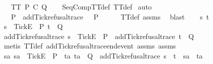 \begin{isabellebody}
{\ \ \ {\isachardoublequoteopen}TT{}\ {\isacharparenleft}P\ {\isacharsemicolon}\isactrlsub C\ Q{\isacharparenright}{\isachardoublequoteclose}\isanewline
%
\isadelimproof
\ \ %
\endisadelimproof
%
\isatagproof
{}\isamarkupfalse%
\ SeqCompTT{\isacharunderscore}def\ TT{}{\isacharunderscore}def\isanewline
{}\isamarkupfalse%
\ auto\isanewline
\ \ \isamarkupfalse%
\ {\isasymrho}\isanewline
\ \ \isamarkupfalse%
\ {\isachardoublequoteopen}{\isasymrho}\ {\isasymin}\ P\ {\isasymLongrightarrow}\ add{\isacharunderscore}Tick{\isacharunderscore}refusal{\isacharunderscore}trace\ {\isasymrho}\ {\isasymin}\ P{\isachardoublequoteclose}\isanewline
\ \ \ \ \isamarkupfalse%
\ TT{}{\isacharunderscore}def\ assms{\isacharparenleft}{}{\isacharparenright}\ \isamarkupfalse%
\ blast\isanewline
{}\isamarkupfalse%
\isanewline
\ \ \isamarkupfalse%
\ s\ t\isanewline
\ \ \isamarkupfalse%
\ {\isachardoublequoteopen}s\ {\isacharat}\ {\isacharbrackleft}{\isacharbrackleft}Tick{\isacharbrackright}\isactrlsub E{\isacharbrackright}\ {\isasymin}\ P{\isachardoublequoteclose}\ {\isachardoublequoteopen}t\ {\isasymin}\ Q{\isachardoublequoteclose}\isanewline
\ \ \isamarkupfalse%
\ \isamarkupfalse%
\ {\isachardoublequoteopen}add{\isacharunderscore}Tick{\isacharunderscore}refusal{\isacharunderscore}trace\ s\ {\isacharat}\ {\isacharbrackleft}{\isacharbrackleft}Tick{\isacharbrackright}\isactrlsub E{\isacharbrackright}\ {\isasymin}\ P\ {\isasymand}\ add{\isacharunderscore}Tick{\isacharunderscore}refusal{\isacharunderscore}trace\ t\ {\isasymin}\ Q{\isachardoublequoteclose}\isanewline
\ \ \ \ \isamarkupfalse%
\ {\isacharparenleft}metis\ TT{}{\isacharunderscore}def\ add{\isacharunderscore}Tick{\isacharunderscore}refusal{\isacharunderscore}trace{\isacharunderscore}end{\isacharunderscore}event\ assms{\isacharparenleft}{}{\isacharparenright}\ assms{\isacharparenleft}{}{\isacharparenright}{\isacharparenright}\isanewline
\ \ \isamarkupfalse%
\ \isamarkupfalse%
\ {\isachardoublequoteopen}{\isasymforall}sa{\isachardot}\ sa\ {\isacharat}\ {\isacharbrackleft}{\isacharbrackleft}Tick{\isacharbrackright}\isactrlsub E{\isacharbrackright}\ {\isasymin}\ P\ {\isasymlongrightarrow}\ {\isacharparenleft}{\isasymforall}ta{\isachardot}\ ta\ {\isasymin}\ Q\ {\isasymlongrightarrow}\ add{\isacharunderscore}Tick{\isacharunderscore}refusal{\isacharunderscore}trace\ {\isacharparenleft}s\ {\isacharat}\ t{\isacharparenright}\ {\isasymnoteq}\ sa\ {\isacharat}\ ta{\isacharparenright}\ {\isasymLongrightarrow}\isanewline
}
\end{isabellebody}
